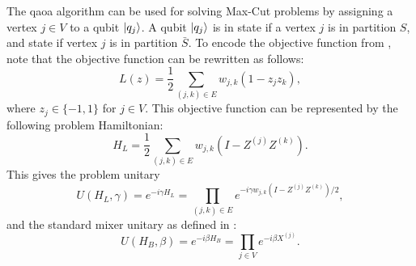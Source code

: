 The \gls{qaoa} algorithm can be used for solving Max-Cut problems by assigning a vertex $j \in V$ to a qubit $\vert{q_j}\rangle$.
A qubit $\vert{q_j}\rangle$ is in state  if a vertex $j$ is in partition $S$, and state  if vertex $j$ is in partition $\bar{S}$.
To encode the objective function from , note that the objective function can be rewritten as follows:
\begin{equation}
L(z) = \frac{1}{2} \sum_{(j, k) \in E} w_{j, k}(1 - z_jz_k),
\end{equation}
where $z_j \in \{-1, 1\}$ for $j \in V$.
This objective function can be represented by the following problem Hamiltonian:
\begin{equation} \label{eqn:problem-hamiltonian}
H_L = \frac{1}{2} \sum_{(j, k) \in E} w_{j, k}(I - Z^{(j)}Z^{(k)}).
\end{equation}
This gives the problem unitary
\begin{equation} \label{eqn:problem-unitary}
U(H_L, \gamma) = e^{-i\gamma H_L} = \prod_{(j, k) \in E} e^{-i\gamma w_{j, k}(I - Z^{(j)}Z^{(k)})/2},
\end{equation}
and the standard mixer unitary as defined in :
\begin{equation} \label{eqn:mixer-unitary}
U(H_B, \beta) = e^{-i\beta H_B} = \prod_{j \in V} e^{-i\beta X^{(j)}}.
\end{equation}

